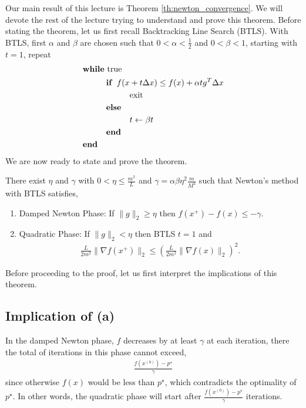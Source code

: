 \documentclass[12pt]{report}
\begin{document}
Our main result of this lecture is Theorem \ref{th:newton_convergence}. We will devote the rest of the lecture trying to understand and prove this theorem. Before stating the theorem, let us first recall Backtracking Line Search (BTLS). With BTLS, first $\alpha$ and $\beta$ are chosen such that $0<\alpha<\frac{1}{2}$ and $0<\beta<1$, starting with $t=1$, repeat
\begin{align*}
& {\bf while} \text{ true} \\
& \hspace{1cm} {\bf if } \,\,\, f(x+t\Delta x)\le f(x)+\alpha t g^T\Delta x \\
& \hspace{2cm} \text{exit} \\
& \hspace{1cm} {\bf else }  \\
& \hspace{2cm} t \leftarrow \beta t \\
& \hspace{1cm} {\bf end }\\
& {\bf end }
\end{align*}
We are now ready to state and prove the theorem.

\begin{theorem}
\label{th:newton_convergence}
There exist $\eta$ and $\gamma$ with $0 < \eta \le \frac{m^2}{L}$ and $\gamma = \alpha \beta \eta^2 \frac{m}{M^2}$ such that Newton's method with BTLS satisfies,
{
\renewcommand{\theenumi}{(\alph{enumi})}
\begin{enumerate} %
\item Damped Newton Phase: If $\|g \|_2 \ge \eta $ then $f(x^{+})-f(x) \le -\gamma$.
\item Quadratic Phase: If $\|g \|_2 < \eta $ then BTLS $t=1$ and
\begin{align}
\label{eq:quad_phase}
\frac{L}{2m^2} \|\nabla f(x^{+}) \|_2 \le \left( \frac{L}{2m^2} \|\nabla f(x) \|_2 \right)^2.
\end{align}
\end{enumerate}
}
\end{theorem}

Before proceeding to the proof, let us first interpret the implications of this theorem.

\subsection*{Implication of (a)}
In the damped Newton phase, $f$ decreases by at least $\gamma$ at each iteration, there the total of iterations in this phase cannot exceed,
\begin{align*}
\frac{f(x^{(0)})-p^\star}{\gamma}
\end{align*}
since otherwise $f(x)$ would be less than $p^\star$, which contradicts the optimality of $p^\star$. In other words, the quadratic phase will start after $\frac{f(x^{(0)})-p^\star}{\gamma}$ iterations.
\end{document}
